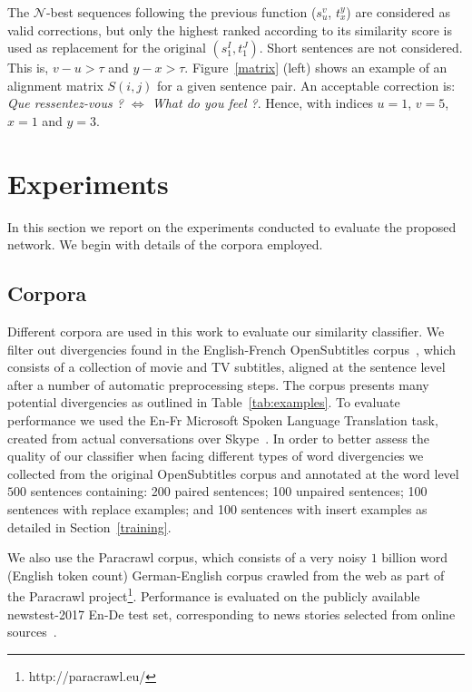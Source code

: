\documentclass[11pt,a4paper]{article}
\begin{document}
The $\mathcal{N}$-best sequences following the previous function ($s_u^v$, $t_x^y$) are considered as valid corrections, but only the highest ranked according to its similarity score is used as replacement for the original $(s_1^I, t_1^J)$.
Short sentences are not considered. This is, $v - u > \tau$ and $y - x > \tau $. 
Figure~\ref{matrix} (left) shows an example of an alignment matrix $S(i,j)$ for a given sentence pair. 
An acceptable correction is: \textit{Que ressentez-vous ? $\Leftrightarrow$ What do you feel ?}. 
Hence, with indices $u=1$, $v=5$, $x=1$ and $y=3$.

\section{Experiments}
\label{experiments}

In this section we report on the experiments conducted to evaluate the proposed network. We begin with details of the corpora employed.

\subsection{Corpora}
\label{corpora}

Different corpora are used in this work to evaluate our similarity classifier.
We filter out divergencies found in the English-French OpenSubtitles corpus~\cite{LisonTiedemann2016}, which consists of a collection of movie and TV subtitles, aligned at the sentence level after a number of automatic preprocessing steps. 
The corpus presents many potential divergencies as outlined in Table~\ref{tab:examples}. 
To evaluate performance we used the En-Fr Microsoft Spoken Language Translation task, created from actual conversations over Skype~\cite{mslt-corpus-iwslt-2016-release}. 
In order to better assess the quality of our classifier when facing different types of word divergencies we collected from the original OpenSubtitles corpus and annotated at the word level $500$ sentences containing:
200 paired sentences;
100 unpaired sentences;
100 sentences with replace examples; and
100 sentences with insert examples as detailed in Section~\ref{training}.

We also use the Paracrawl corpus, which consists of a very noisy $1$ billion word (English token count) German-English corpus crawled from the web as part of the Paracrawl project\footnote{http://paracrawl.eu/}.
Performance is evaluated on the publicly available newstest-2017 En-De test set, corresponding to news stories selected from online sources~\cite{W17-4717}.
\end{document}
